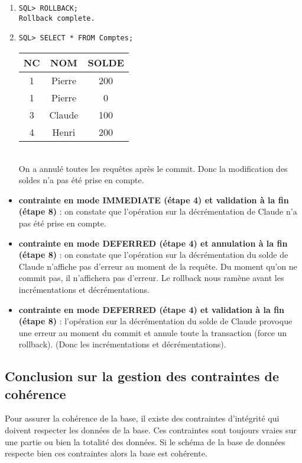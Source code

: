 \documentclass{article}
\begin{document}
\begin{enumerate}[label=\arabic*)]
	\item
		\begin{lstlisting}
SQL> ROLLBACK;
Rollback complete.
		\end{lstlisting}

	\item
		\begin{lstlisting}
SQL> SELECT * FROM Comptes;
		\end{lstlisting}

\begin{tabular}{|c|c|c|}
	\hline
        	NC & NOM & SOLDE \\
	\hline        
 	1 & Pierre & 200 \\
	\hline         
	1 & Pierre & 0 \\
	\hline
	3 & Claude & 100 \\
	\hline
	4 & Henri & 200 \\
	\hline
\end{tabular} \\

On a annulé toutes les requêtes après le commit. Donc la modification des soldes n'a pas été prise en compte.
\end{enumerate}

\begin{itemize}\renewcommand{\labelitemi}{$\bullet$}
	\item \textbf{contrainte en mode IMMEDIATE (étape 4) et validation à la fin (étape 8)} : on constate que l'opération sur la décrémentation de Claude n'a pas été prise en compte.
	\item \textbf{contrainte en mode DEFERRED (étape 4) et annulation à la fin (étape 8)} : on constate que l'opération sur la décrémentation du solde de Claude n'affiche pas d'erreur au moment de la requête. Du moment qu'on ne commit pas, il n'affichera pas d'erreur. Le rollback nous ramène avant les incrémentations et décrémentations.
	\item \textbf{contrainte en mode DEFERRED (étape 4) et validation à la fin (étape 8)} : l'opération sur la décrémentation du solde de Claude provoque une erreur au moment du commit et annule toute la transaction (force un rollback). (Donc les incrémentations et décrémentations).
\end{itemize}


\subsection*{Conclusion sur la gestion des contraintes de cohérence}
Pour assurer la cohérence de la base, il existe des contraintes d'intégrité qui doivent respecter les données de la base. Ces contraintes sont toujours vraies sur une partie ou bien la totalité des données. Si le schéma de la base de données respecte bien ces contraintes alors la base est cohérente.
\end{document}
